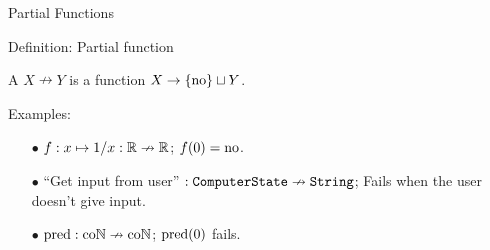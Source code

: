 \begin{frame}{Partial Functions} %
  
  \begin{block}{Definition: Partial function}

    \par A  $X \nrightarrow Y$ is a function $X \to \{\mathrm{no}\} \sqcup Y$.

  \end{block}

  \par Examples:\pause
  \begin{itemize}
    \item[$\bullet$] {
      $f : x \mapsto 1 / x : \mathbb{R} \nrightarrow \mathbb{R}$;
      \newline
      $f(0) = \mathrm{no}$.
      \newline
    }\pause
    \item[$\bullet$] {
      ``Get input from user'' $: \texttt{ComputerState} \nrightarrow \texttt{String}$;
      \newline
      Fails when the user doesn't give input.
      \newline
    }\pause
    \item[$\bullet$] {
      $\operatorname{pred} : \mathrm{co}\mathbb{N} \nrightarrow \mathrm{co}\mathbb{N}$;
      \newline
      $\operatorname{pred}(0)$ fails.
    }
  \end{itemize}

\end{frame}

